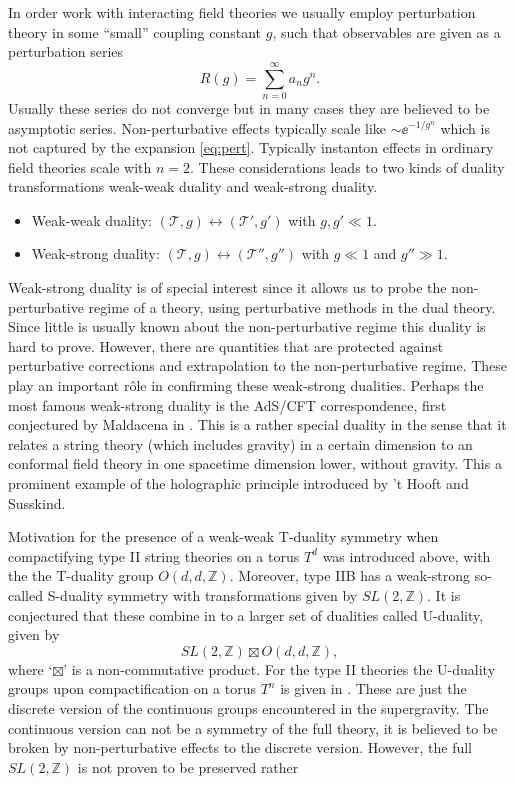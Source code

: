 In order work with interacting field theories we usually employ perturbation theory in some ``small'' coupling constant $g$, such that observables are given as a perturbation series 
\begin{equation}\label{eq:pert}
    R(g) = \sum_{n=0}^{\infty}a_n g^n.
\end{equation}
Usually these series do not converge but in many cases they are believed to be asymptotic series. Non-perturbative effects typically scale like $\sim \ee^{-1/g^n}$ which is not captured by the expansion \eqref{eq:pert}. Typically instanton effects in ordinary field theories scale with $n=2$. These considerations leads to two kinds of duality transformations weak-weak duality and weak-strong duality. 
\begin{itemize}
    \item Weak-weak duality: $\left(\mathscr{T},g\right)\leftrightarrow\left(\mathscr{T}',g'\right)$ with $g,g'\ll 1$.
    \item Weak-strong duality: $\left(\mathscr{T},g\right)\leftrightarrow\left(\mathscr{T}'',g''\right)$ with $g\ll 1$ and $g''\gg 1$.
\end{itemize}
Weak-strong duality is of special interest since it allows us to probe the non-perturbative regime of a theory, using perturbative methods in the dual theory. Since little is usually known about the non-perturbative regime this duality is hard to prove. However, there are quantities that are protected against perturbative corrections and extrapolation to the non-perturbative regime. These play an important rôle in confirming these weak-strong dualities. Perhaps the most famous weak-strong duality is the AdS/CFT correspondence, first conjectured by Maldacena in \cite{Maldacena1999}. This is a rather special duality in the sense that it relates a string theory (which includes gravity) in a certain dimension to an conformal field theory in one spacetime dimension lower, without gravity. This a prominent example of the holographic principle introduced by 't Hooft and Susskind.

Motivation for the presence of a weak-weak T-duality symmetry when compactifying type II string theories on a torus $T^d$ was introduced above, with the the T-duality group $O(d,d,\mathbb{Z})$. Moreover, type IIB has a weak-strong so-called S-duality symmetry with transformations given by $SL(2,\mathbb{Z})$. It is conjectured that these combine in to a larger set of dualities called U-duality, given by 
\begin{equation}
    SL(2,\mathbb{Z})\boxtimes O(d,d,\mathbb{Z}),
\end{equation}
where `$\boxtimes$' is a non-commutative product. For the type II theories the U-duality groups upon compactification on a torus $T^{n}$ is given in . These are just the discrete version of the continuous groups encountered in the supergravity. The continuous version can not be a symmetry of the full theory, it is believed to be broken by non-perturbative effects to the discrete version. However, the full $SL(2,\mathbb{Z})$ is not proven to be preserved rather 

